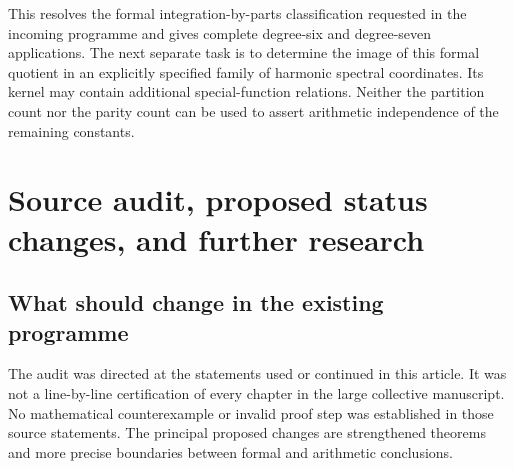 \documentclass[11pt,a4paper]{article}
\numberwithin{equation}{section}
\theoremstyle{plain}
\theoremstyle{definition}
\theoremstyle{remark}
\begin{document}
This resolves the formal integration-by-parts classification requested
in the incoming programme and gives complete degree-six and degree-seven
applications. The next separate task is to determine the image of this
formal quotient in an explicitly specified family of harmonic spectral
coordinates. Its kernel may contain additional special-function
relations. Neither the partition count nor the parity count can be
used to assert arithmetic independence of the remaining constants.




\section{Source audit, proposed status changes, and further research}
\label{sec:audit-research}

\subsection{What should change in the existing programme}

The audit was directed at the statements used or continued in this
article. It was not a line-by-line certification of every chapter in the
large collective manuscript. No mathematical counterexample or invalid
proof step was established in those source statements. The principal
proposed changes are strengthened theorems and more precise boundaries
between formal and arithmetic conclusions.
\end{document}
